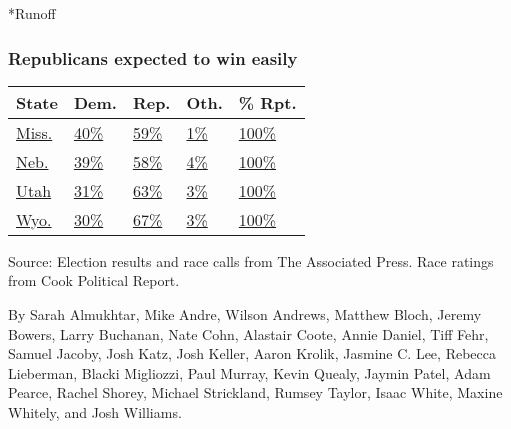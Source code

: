 *Runoff

\hypertarget{republicans-expected-to-win-easily-1}{%
\subsubsection{Republicans expected to win
easily}\label{republicans-expected-to-win-easily-1}}

\begin{longtable}[]{@{}lllll@{}}
\toprule
State & Dem. & Rep. & Oth. & \% Rpt.\tabularnewline
\midrule
\endhead
\href{https://www.nytimes3xbfgragh.onion/elections/results/mississippi-senate}{Miss.}
&
\href{https://www.nytimes3xbfgragh.onion/elections/results/mississippi-senate}{40\%}
&
\href{https://www.nytimes3xbfgragh.onion/elections/results/mississippi-senate}{59\%}
&
\href{https://www.nytimes3xbfgragh.onion/elections/results/mississippi-senate}{1\%}
&
\href{https://www.nytimes3xbfgragh.onion/elections/results/mississippi-senate}{100\%}\tabularnewline
\href{https://www.nytimes3xbfgragh.onion/elections/results/nebraska-senate}{Neb.}
&
\href{https://www.nytimes3xbfgragh.onion/elections/results/nebraska-senate}{39\%}
&
\href{https://www.nytimes3xbfgragh.onion/elections/results/nebraska-senate}{58\%}
&
\href{https://www.nytimes3xbfgragh.onion/elections/results/nebraska-senate}{4\%}
&
\href{https://www.nytimes3xbfgragh.onion/elections/results/nebraska-senate}{100\%}\tabularnewline
\href{https://www.nytimes3xbfgragh.onion/elections/results/utah-senate}{Utah}
&
\href{https://www.nytimes3xbfgragh.onion/elections/results/utah-senate}{31\%}
&
\href{https://www.nytimes3xbfgragh.onion/elections/results/utah-senate}{63\%}
&
\href{https://www.nytimes3xbfgragh.onion/elections/results/utah-senate}{3\%}
&
\href{https://www.nytimes3xbfgragh.onion/elections/results/utah-senate}{100\%}\tabularnewline
\href{https://www.nytimes3xbfgragh.onion/elections/results/wyoming-senate}{Wyo.}
&
\href{https://www.nytimes3xbfgragh.onion/elections/results/wyoming-senate}{30\%}
&
\href{https://www.nytimes3xbfgragh.onion/elections/results/wyoming-senate}{67\%}
&
\href{https://www.nytimes3xbfgragh.onion/elections/results/wyoming-senate}{3\%}
&
\href{https://www.nytimes3xbfgragh.onion/elections/results/wyoming-senate}{100\%}\tabularnewline
\bottomrule
\end{longtable}

Source: Election results and race calls from The Associated Press. Race
ratings from Cook Political Report.

By Sarah Almukhtar, Mike Andre, Wilson Andrews, Matthew Bloch, Jeremy
Bowers, Larry Buchanan, Nate Cohn, Alastair Coote, Annie Daniel, Tiff
Fehr, Samuel Jacoby, Josh Katz, Josh Keller, Aaron Krolik, Jasmine C.
Lee, Rebecca Lieberman, Blacki Migliozzi, Paul Murray, Kevin Quealy,
Jaymin Patel, Adam Pearce, Rachel Shorey, Michael Strickland, Rumsey
Taylor, Isaac White, Maxine Whitely, and Josh Williams.

